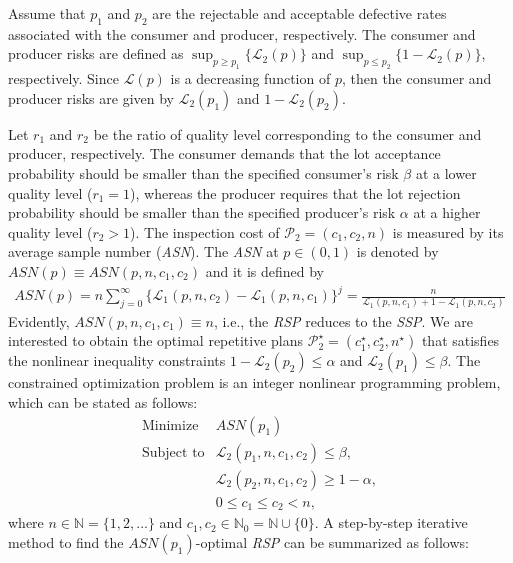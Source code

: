 \documentclass[twoside]{article}
\begin{document}
Assume that $p_1$ and $p_2$ are the rejectable and acceptable   defective rates associated with the  consumer and producer, respectively. 
The   consumer and producer risks  are defined  as  $\sup_{p\geq p_1}\{\mathcal{L}_2(p)\}$ and $\sup_{p\leq p_2}\{1-\mathcal{L}_2(p)\}$, respectively.
Since $\mathcal{L}(p)$ is a decreasing function of $p$, then the consumer and producer risks are given by 
  $\mathcal{L}_2(p_1)$ and  $1-\mathcal{L}_2(p_2)$.
 
Let $r_1$ and $r_2$ be the ratio of quality level corresponding to the consumer and producer, respectively.
 The consumer demands that
the lot acceptance probability should be smaller than the speciﬁed consumer's risk $\beta$ at a lower
quality level ($r_1=1$), whereas the producer requires that the lot rejection probability
should be smaller than the speciﬁed producer’s risk $\alpha$ at a higher quality level ($r_2>1$). 
%
%
%
  The inspection cost of $\mathcal{P}_2=(c_1,c_2,n)$ is measured by its average sample number (\textit{ASN}).  The \textit{ASN} at $p\in(0,1)$ is denoted by   $ASN(p)\equiv ASN(p,n,c_1,c_2)$ and it is defined by
\begin{eqnarray}\label{asn}
	ASN(p)=n\sum_{j=0}^{\infty}\{\mathcal{L}_1(p,n,c_2)-\mathcal{L}_1(p,n,c_1)\}^j=
\frac{n}{\mathcal{L}_1(p,n,c_1)+1-\mathcal{L}_1(p,n,c_2)}
\end{eqnarray}
Evidently, $ASN(p,n,c_1,c_1)\equiv n$, i.e., the \textit{RSP}  reduces to the \textit{SSP}. 
We are interested to obtain the optimal repetitive plans  $\mathcal{P}^{\star}_2=(c_1^{\star},c_2^{\star},n^{\star})$  that satisfies the nonlinear inequality constraints
$1-\mathcal{L}_2(p_2)\leq \alpha$ and $\mathcal{L}_2(p_1)\leq \beta$.
%
The constrained optimization problem is an integer nonlinear programming problem, which can be stated as follows:
%
\begin{equation}
\label{optim}
\begin{array}{lllll}
\text{Minimize} & ASN(p_1)  \\
\text{Subject to} & \mathcal{L}_2(p_1,n,c_1,c_2)\leq \beta,\\
                           &  \mathcal{L}_2(p_2,n,c_1,c_2)\geq 1-\alpha,\\
                           &0\leq c_1\leq c_2<n,                        
\end{array}
\end{equation}
where $n\in\mathbb{N}=\{1,2,...\}$ and $c_1,c_2\in\mathbb{N}_0=\mathbb{N}\cup\{0\}$.
 A step-by-step iterative method  to find the $ASN(p_1)$-optimal \textit{RSP} can be summarized as follows:
\end{document}
